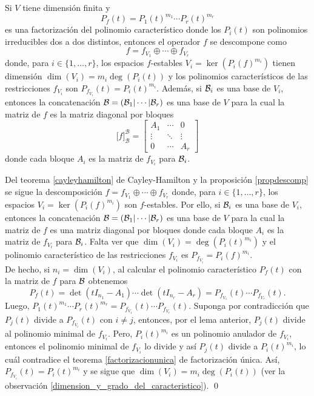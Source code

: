 \begin{teo}
  Si $V$ tiene dimensión finita y $$P_f(t)=P_1(t)^{m_1}\cdots P_r(t)^{m_r}$$ es una factorización del polinomio característico donde los $P_i(t)$ son polinomios irreducibles dos a dos distintos, entonces el operador $f$ se descompone como $$f=f_{V_1}\oplus\cdots\oplus f_{V_r}$$ donde, para $i\in\{1,\ldots,r\}$, los espacios $f$-estables $V_i=\ker\left(P_i(f)^{m_i}\right)$ tienen dimensión $\dim(V_i)=m_i\deg\left(P_i(t)\right)$ y los polinomios característicos de las restricciones $f_{V_i}$ son $P_{f_{V_i}}(t)=P_i(t)^{m_i}$. Además, si $\mathcal{B}_i$ es una base de $V_i$, entonces la concatenación $\mathcal{B}=(\mathcal{B}_1|\cdots|\mathcal{B}_r)$ es una base de $V$ para la cual la matriz de $f$ es la matriz diagonal por bloques
  \[
    \Big[f\Big]^\mathcal{B}_\mathcal{B}=\left[\begin{array}{c|c|c}
      A_1 & \cdots & 0\\
      \hline
      \vdots & \ddots & \vdots\\
      \hline
      0 & \cdots & A_r
      \end{array}\right] 
  \]
  donde cada bloque $A_i$ es la matriz de $f_{V_i}$ para $\mathcal{B}_i$. 
\end{teo}

\dem Del teorema \ref{cayleyhamilton} de Cayley-Hamilton y la proposición \ref{propdescomp} se sigue la descomposición $f=f_{V_1}\oplus\cdots\oplus f_{V_r}$ donde, para $i\in\{1,\ldots,r\}$, los espacios $V_i=\ker\left(P_i(f)^{m_i}\right)$ son $f$-estables. Por ello, si $\mathcal{B}_i$ es una base de $V_i$, entonces la concatenación $\mathcal{B}=(\mathcal{B}_1|\cdots|\mathcal{B}_r)$ es una base de $V$ para la cual la matriz de $f$ es una matriz diagonal por bloques donde cada bloque $A_i$ es la matriz de $f_{V_i}$ para $\mathcal{B}_i$. Falta ver que $\dim(V_i)=\deg\left(P_i(t)^{m_i}\right)$ y el polinomio característico de las restricciones $f_{V_i}$ es $P_{f_{V_i}}=P_i(f)^{m_i}$.\\
De hecho, si $n_i=\dim(V_i)$, al calcular el polinomio característico $P_f(t)$ con la matriz de $f$ para $\mathcal{B}$ obtenemos
$$P_f(t)=\det(tI_{n_1}-A_1)\cdots\det(tI_{n_r}-A_r)=P_{f_{V_1}}(t)\cdots P_{f_{V_r}}(t).$$
Luego, $P_1(t)^{m_1}\cdots P_r(t)^{m_r}=P_{f_{V_1}}(t)\cdots P_{f_{V_r}}(t)$. Suponga por contradicción que $P_j(t)$ divide a $P_{f_{V_i}}(t)$ con $i\ne j$, entonces, por el lema anterior, $P_j(t)$ divide al polinomio minimal de $f_{V_i}$. Pero, $P_i(t)^{m_i}$ es un polinomio anulador de $f_{V_i}$, entonces el polinomio minimal de $f_{V_i}$ lo divide y así $P_j(t)$ divide a $P_i(t)^{m_i}$, lo cuál contradice el teorema \ref{factorizacionunica} de factorización única. Así, $P_{f_{V_i}}(t)=P_i(t)^{m_i}$ y se sigue que $\dim(V_i)=m_i\deg\left(P_i(t)\right)$ (ver la observación \ref{dimension_y_grado_del_caracteristico}). 
\qed

